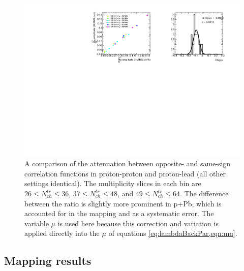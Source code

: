 \begin{figure}[t]
\begin{minipage}[t]{1.0\textwidth}
\centering
\includegraphics{mu_hijing_pp_pPb.pdf}
\end{minipage}
\caption{A comparison of the attenuation between opposite- and same-sign correlation functions in \Hijing proton-proton and \Hijing proton-lead (all other settings identical). The multiplicity slices in each \kt bin are $26 \leq N_{ch}^{tr} \leq 36$, $37 \leq N_{ch}^{tr} \leq 48$, and $49 \leq N_{ch}^{tr} \leq 64$. The difference between the ratio is slightly more prominent in p+Pb, which is accounted for in the mapping and as a systematic error. The variable $\mu$ is used here because this correction and variation is applied directly into the $\mu$ of equations \cref{eq:lambdaBackPar,eqn:mu}.}
\label{fig:mu_hijing_pp_pPb}
\end{figure}

\FloatBarrier

\subsection{Mapping results}

